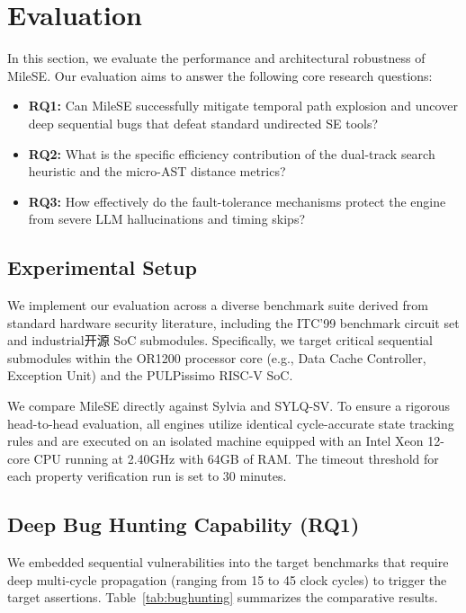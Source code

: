 \documentclass[conference]{IEEEtran}
\begin{document}
\section{Evaluation}
\label{sec:evaluation}
In this section, we evaluate the performance and architectural robustness of MileSE. Our evaluation aims to answer the following core research questions:
\begin{itemize}
    \item \textbf{RQ1:} Can MileSE successfully mitigate temporal path explosion and uncover deep sequential bugs that defeat standard undirected SE tools?
    \item \textbf{RQ2:} What is the specific efficiency contribution of the dual-track search heuristic and the micro-AST distance metrics?
    \item \textbf{RQ3:} How effectively do the fault-tolerance mechanisms protect the engine from severe LLM hallucinations and timing skips?
\end{itemize}

\subsection{Experimental Setup}
We implement our evaluation across a diverse benchmark suite derived from standard hardware security literature, including the ITC'99 benchmark circuit set and industrial开源 SoC submodules. Specifically, we target critical sequential submodules within the OR1200 processor core (e.g., Data Cache Controller, Exception Unit) and the PULPissimo RISC-V SoC. 

We compare MileSE directly against Sylvia and SYLQ-SV. To ensure a rigorous head-to-head evaluation, all engines utilize identical cycle-accurate state tracking rules and are executed on an isolated machine equipped with an Intel Xeon 12-core CPU running at 2.40GHz with 64GB of RAM. The timeout threshold for each property verification run is set to 30 minutes.

\subsection{Deep Bug Hunting Capability (RQ1)}
We embedded sequential vulnerabilities into the target benchmarks that require deep multi-cycle propagation (ranging from 15 to 45 clock cycles) to trigger the target assertions. Table~\ref{tab:bughunting} summarizes the comparative results.
\end{document}
